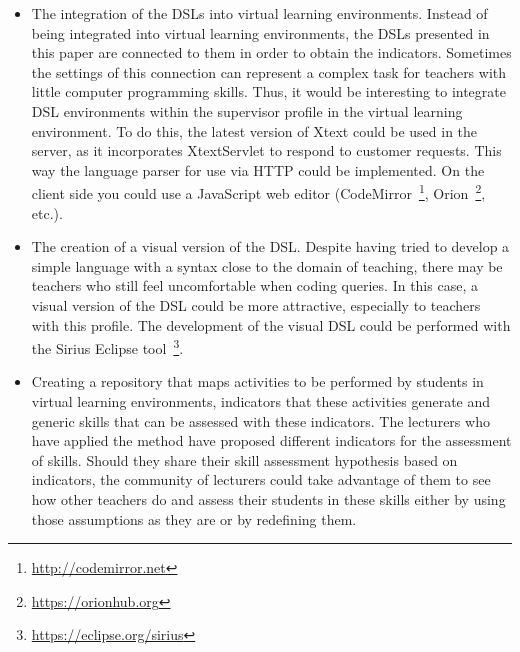 \begin{itemize}
\item The integration of the DSLs into virtual learning environments. Instead of being integrated into virtual learning environments, the DSLs presented in this paper are connected to them in order to obtain the indicators. Sometimes the settings of this connection can represent a complex task for teachers with little computer programming skills. Thus, it would be interesting to integrate DSL environments within the supervisor profile in the virtual learning environment. To do this, the latest version of Xtext could be used in the server, as it incorporates XtextServlet to respond to customer requests. This way the language parser for use via HTTP could be implemented. On the client side you could use a JavaScript  web editor (CodeMirror~\footnote{\url{http://codemirror.net}}, Orion~\footnote{\url{https://orionhub.org}}, etc.).
\item The creation of a visual version of the DSL. Despite having tried to develop a simple language with a syntax close to the domain of teaching, there may be teachers who still feel uncomfortable when coding queries. In this case, a visual version of the DSL could be more attractive, especially to teachers with this profile. The development of the visual DSL could be performed with the Sirius Eclipse tool~\footnote{\url{https://eclipse.org/sirius}}.
\item Creating a repository that maps activities to be performed by students in virtual learning environments, indicators that these activities generate and generic skills that can be assessed with these indicators. The lecturers who have applied the method have proposed different indicators for the assessment of skills. Should they share their skill assessment hypothesis based on indicators, the community of lecturers could take advantage of them to see how other teachers do and assess their students in these skills either by using those assumptions as they are or by redefining them.
\end{itemize}


